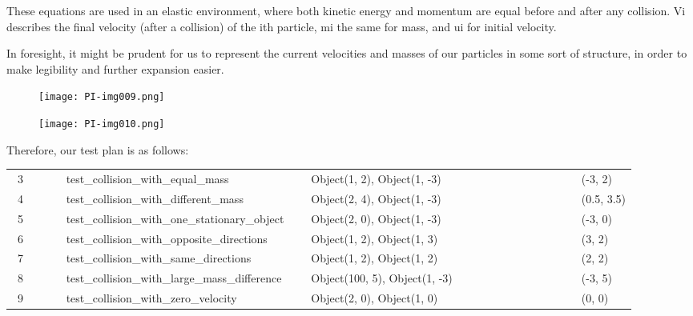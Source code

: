 \documentclass{article}
\begin{document}
\bigskip

These equations are used in an elastic environment, where both kinetic energy and momentum are equal before and after
any collision. Vi describes the final velocity (after a collision) of the ith particle, mi the same for mass, and ui
for initial velocity.

In foresight, it might be prudent for us to represent the current velocities and masses of our particles in some sort of
structure, in order to make legibility and further expansion easier.



\begin{figure}
\texttt{[image: PI-img009.png]}\end{figure}


\begin{figure}
\texttt{[image: PI-img010.png]}\end{figure}

\bigskip

Therefore, our test plan is as follows:

\begin{flushleft}
\tabletail{}
\tablelasttail{}
\begin{supertabular}{m{0.83cm}m{7.039cm}m{4.4430003cm}m{0.8880001cm}}
\ 3 \ \ \  &
\ test\_collision\_with\_equal\_mass \ \ \ \ \ \ \ \ \ \ \  &
\ Object(1, 2), Object(1, -3) \ \ \ \ \ \ \ \ \ \ \ \ \ \ \ \ \ \ \ \ \ \  &
(-3, 2)\\
\ 4 \ \ \  &
\ test\_collision\_with\_different\_mass \ \ \ \ \ \ \  &
\ Object(2, 4), Object(1, -3) \ \ \ \ \ \ \ \ \ \ \ \ \ \ \ \ \ \ \ \ \ \  &
(0.5, 3.5)\\
\ 5 \ \ \ \  &
\ test\_collision\_with\_one\_stationary\_object  &
\ Object(2, 0), Object(1, -3) \ \ \ \ \ \ \ \ \ \ \ \ \ \ \ \ \ \ \ \ \ \  &
(-3, 0)\\
\ 6 \ \ \ \  &
\ test\_collision\_with\_opposite\_directions \ \  &
\ Object(1, 2), Object(1, 3) \ \ \ \ \ \ \ \ \ \ \ \ \ \ \ \ \ \ \ \ \ \ \  &
(3, 2)\\
\ 7 \ \ \ \  &
\ test\_collision\_with\_same\_directions \ \ \ \ \ \  &
\ Object(1, 2), Object(1, 2) \ \ \ \ \ \ \ \ \ \ \ \ \ \ \ \ \ \ \ \ \ \ \  &
(2, 2)\\
\ 8 \ \ \ \  &
\ test\_collision\_with\_large\_mass\_difference  &
\ Object(100, 5), Object(1, -3) \ \ \ \ \ \ \ \ \ \ \ \ \ \ \ \ \ \ \ \  &
(-3, 5)\\
\ 9 \ \ \ \  &
\ test\_collision\_with\_zero\_velocity \ \ \ \ \ \ \ \  &
\ Object(2, 0), Object(1, 0) \ \ \ \ \ \ \ \ \ \ \ \ \ \ \ \ \ \ \ \ \ \ \  &
(0, 0)\\
\end{supertabular}
\end{flushleft}
\end{document}
